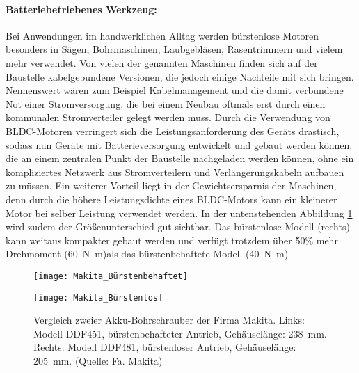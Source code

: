 \paragraph{Batteriebetriebenes Werkzeug:} Bei Anwendungen im handwerklichen Alltag werden bürstenlose Motoren besonders in Sägen, Bohrmaschinen, Laubgebläsen, Rasentrimmern und vielem mehr verwendet. Von vielen der genannten Maschinen finden sich auf der Baustelle kabelgebundene Versionen, die jedoch einige Nachteile mit sich bringen. Nennenswert wären zum Beispiel Kabelmanagement und die damit verbundene Not einer Stromversorgung, die bei einem Neubau oftmals erst durch einen kommunalen Stromverteiler gelegt werden muss. Durch die Verwendung von BLDC-Motoren verringert sich die Leistungsanforderung des Geräts drastisch, sodass nun Geräte mit Batterieversorgung entwickelt und gebaut werden können, die an einem zentralen Punkt der Baustelle nachgeladen werden können, ohne ein kompliziertes Netzwerk aus Stromverteilern und Verlängerungskabeln aufbauen zu müssen. Ein weiterer Vorteil liegt in der Gewichtsersparnis der Maschinen, denn durch die höhere Leistungsdichte eines BLDC-Motors kann ein kleinerer Motor bei selber Leistung verwendet werden. In der untenstehenden Abbildung \ref{fig:Vergleich} wird zudem der Größenunterschied gut sichtbar. Das bürstenlose Modell (rechts) kann weitaus kompakter gebaut werden und verfügt trotzdem über 50\% mehr Drehmoment (\SI{60}{\newton\meter})als das bürstenbehaftete Modell (\SI{40}{\newton\meter})

\begin{figure}[H]
  \centering
  \begin{minipage}{.49\textwidth}
    \centering
    \texttt{[image: Makita\_Bürstenbehaftet]}
  \end{minipage}\hfill%
  \begin{minipage}{.49\textwidth}
    \centering
    \texttt{[image: Makita\_Bürstenlos]}
  \end{minipage}
  \caption[Vergleich Akkubohrschrauber]{Vergleich zweier Akku-Bohrschrauber der Firma Makita. Links: Modell DDF451, bürstenbehafteter Antrieb, Gehäuselänge: \SI{238}{\milli\meter}. Rechts: Modell DDF481, bürstenloser Antrieb, Gehäuselänge: \SI{205}{\milli\meter}. (Quelle: Fa. Makita)}
  \label{fig:Vergleich}
\end{figure}

